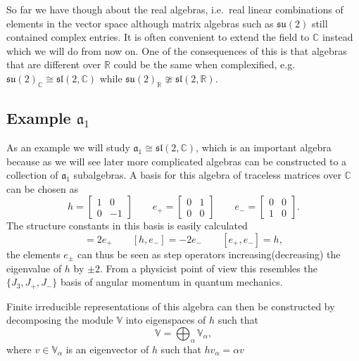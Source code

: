 So far we have though about the real algebras, i.e.\ real linear combinations of elements in the vector space although matrix algebras such as $\mathfrak{su}(2)$ still contained complex entries. It is often convenient to extend the field to $\mathbb{C}$ instead which we will do from now on. One of the consequences of this is that algebras that are different over $\mathbb{R}$ could be the same when complexified, e.g.\ $\mathfrak{su}(2)_\mathbb{C}\cong \mathfrak{sl}(2,\mathbb{C})$ while $\mathfrak{su}(2)_\mathbb{R}\ncong\mathfrak{sl}(2,\mathbb{\mathbb{R}})$. 



\subsection{Example $\mathfrak{a}_1$}
As an example we will study $\mathfrak{a}_1\cong\mathfrak{sl}(2,\mathbb{C})$, which is an important algebra because as we will see later more complicated algebras can be constructed to a collection of $\mathfrak{a}_1$ subalgebras. A basis for this algebra of traceless matrices over $\mathbb{C}$ can be chosen as 
\begin{equation}
    h=\begin{bmatrix}1&0\\0 &-1\end{bmatrix}\qquad e_+=\begin{bmatrix}0&1\\0 &0\end{bmatrix}\qquad e_-=\begin{bmatrix}0&0\\1 &0\end{bmatrix}.
\end{equation}
The structure constants in this basis is easily calculated 
\begin{equation}
    [h,e_+] = 2e_+\qquad [h,e_-]=-2e_- \qquad [e_+,e_-]=h,
\end{equation}
the elements $e_{\pm}$ can thus be seen as step operators increasing(decreasing) the eigenvalue of $h$ by $\pm 2$. From a physicist point of view this resembles the $\{J_3,J_+,J_-\}$ basis of angular momentum in quantum mechanics. 

Finite irreducible representations of this algebra can then be constructed by decomposing the module $\mathbb{V}$ into eigenspaces of $h$ such that 
\begin{equation}
    \mathbb{V} = \bigoplus_\alpha \mathbb{V}_\alpha,
\end{equation}
where $v\in\mathbb{V}_\alpha$ is an eigenvector of $h$ such that $hv_\alpha = \alpha v$